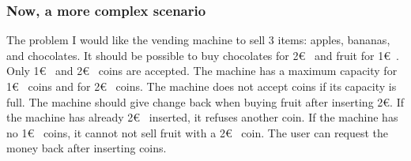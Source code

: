 \documentclass[aspectratio=169]{beamer}
\begin{document}
\begin{frame}
  \frametitle{Now, a more complex scenario}
  \begin{block}{The problem}
    I would like the vending machine to sell 3 items: apples, bananas, and chocolates. It should
be possible to buy chocolates for 2\euro~ and fruit for 1\euro~. Only 1\euro~ and 2\euro~ coins are accepted. The machine has a maximum capacity for 1\euro~ coins and for 2\euro~ coins. The machine does
not accept coins if its capacity is full. The machine should give change back when buying
fruit after inserting 2\euro. If the machine has already 2\euro~ inserted, it refuses another coin. If
the machine has no 1\euro~ coins, it cannot not sell fruit with a 2\euro~ coin. The user can request
the money back after inserting coins.
  \end{block}
\end{frame}
\end{document}
